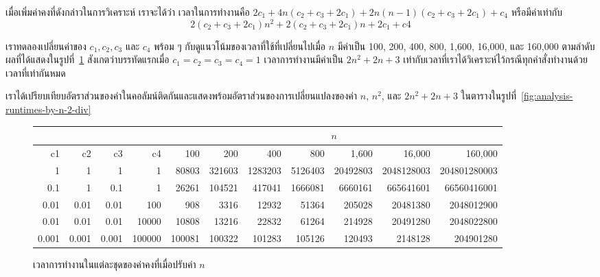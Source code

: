 เมื่อ{\wbr}เพิ่ม{\wbr}ค่าคงที่{\wbr}ดังกล่าว{\wbr}ใน{\wbr}การ{\wbr}วิเคราะห์ เรา{\wbr}จะ{\wbr}ได้{\wbr}ว่า เวลา{\wbr}ใน{\wbr}การ{\wbr}ทำงาน{\wbr}คือ{\wbr}
$2 c_1 + 4n(c_2 +c_3 + 2c_1) + 2n(n-1)(c_2 +c_3 + 2c_1) + c_4$ หรือ{\wbr}มี{\wbr}ค่า{\wbr}เท่า{\wbr}กับ{\wbr}
\[
2(c_2+c_3+2c_1)n^2 + 2(c_2 + c_3 + 2c_1)n + 2c_1 + c4
\]

เรา{\wbr}ทดลอง{\wbr}เปลี่ยน{\wbr}ค่า{\wbr}ของ $c_1,c_2,c_3$ และ $c_4$ พร้อม ๆ
กับ{\wbr}ดู{\wbr}แนวโน้ม{\wbr}ของ{\wbr}เวลา{\wbr}ที่{\wbr}ใช้{\wbr}ที่{\wbr}เปลี่ยน{\wbr}ไป{\wbr}เมื่อ $n$ มี{\wbr}ค่า{\wbr}เป็น 100, 200, 400, 800, 1,600,
16,000, และ 160,000 ตาม{\wbr}ลำดับ{\wbr}
ผล{\wbr}ที่{\wbr}ได้{\wbr}แสดง{\wbr}ใน{\wbr}รูป{\wbr}ที่~\ref{fig:analysis-runtimes-by-n-2} สังเกต{\wbr}ว่า{\wbr}บรรทัด{\wbr}แรก{\wbr}เมื่อ{\wbr}
$c_1=c_2=c_3=c_4=1$ เวลา{\wbr}การ{\wbr}ทำงาน{\wbr}มี{\wbr}ค่า{\wbr}เป็น $2n^2+2n+3$
เท่า{\wbr}กับ{\wbr}เวลา{\wbr}ที่{\wbr}เรา{\wbr}ได้{\wbr}วิเคราะห์{\wbr}ไว้{\wbr}กรณี{\wbr}ทุก{\wbr}คำสั่ง{\wbr}ทำงาน{\wbr}ด้วย{\wbr}เวลา{\wbr}ที่{\wbr}เท่า{\wbr}กัน{\wbr}หมด{\wbr}

เรา{\wbr}ได้{\wbr}เปรียบเทียบ{\wbr}อัตราส่วน{\wbr}ของ{\wbr}ค่า{\wbr}ใน{\wbr}คอลัมน์{\wbr}ติด{\wbr}กัน{\wbr}และ{\wbr}แสดง{\wbr}พร้อม{\wbr}อัตราส่วน{\wbr}ของ{\wbr}การ{\wbr}เปลี่ยนแปลง{\wbr}ของ{\wbr}ค่า{\wbr}
$n$, $n^2$, และ $2n^2+2n+3$
ใน{\wbr}ตาราง{\wbr}ใน{\wbr}รูป{\wbr}ที่~\ref{fig:analysis-runtimes-by-n-2-div}

\begin{figure}
{\footnotesize
\begin{center}
\begin{tabular}{|r|r|r|r|r|r|r|r|r|r|r|}
\hline
\multicolumn{4}{|c|}{} & \multicolumn{7}{c|}{$n$}\\
\hline
c1 & c2 & c3 & c4 & 100 & 200 & 400 & 800 & 1,600 & 16,000 & 160,000\\
\hline
1 & 1 & 1 & 1 & 80803 & 321603 & 1283203 & 5126403 & 20492803 & 2048128003 & 204801280003\\
0.1 & 1 & 0.1 & 1 & 26261 & 104521 & 417041 & 1666081 & 6660161 & 665641601 & 66560416001\\
0.01 & 0.01 & 0.01 & 100 & 908 & 3316 & 12932 & 51364 & 205028 & 20481380 & 2048012900\\
0.01 & 0.01 & 0.01 & 10000 & 10808 & 13216 & 22832 & 61264 & 214928 & 20491280 & 2048022800\\
0.001 & 0.001 & 0.001 & 100000 & 100081 & 100322 & 101283 & 105126 & 120493 & 2148128 & 204901280\\
\hline
\end{tabular}
\end{center}
}
\caption{เวลา{\wbr}การ{\wbr}ทำงาน{\wbr}ใน{\wbr}แต่ละ{\wbr}ชุด{\wbr}ของ{\wbr}ค่าคงที่{\wbr}เมื่อ{\wbr}ปรับ{\wbr}ค่า $n$}
\label{fig:analysis-runtimes-by-n-2}
\end{figure}

